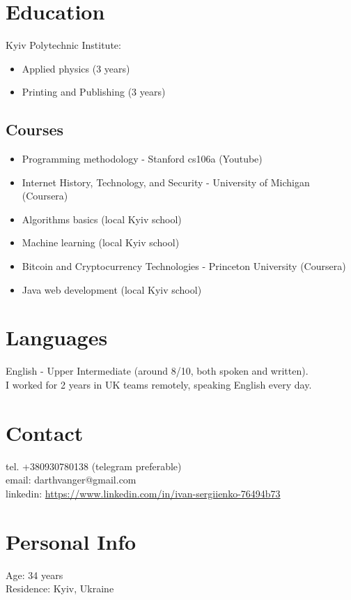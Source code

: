 \documentclass[a4paper, 14pt]{article}
\begin{document}
\section{Education}
  Kyiv Polytechnic Institute: 
  \begin{itemize}
    \item Applied physics (3 years) \\
    \item Printing and Publishing (3 years)
  \end{itemize}

  \subsection{Courses}
  \begin{itemize}
    \item Programming methodology - Stanford cs106a (Youtube) \\
    \item Internet History, Technology, and Security - University of Michigan (Coursera) \\
    \item Algorithms basics (local Kyiv school) \\
    \item Machine learning (local Kyiv school) \\
    \item Bitcoin and Cryptocurrency Technologies - Princeton University (Coursera) \\
    \item Java web development (local Kyiv school)
  \end{itemize}

\section{Languages}
	English - Upper Intermediate (around 8/10, both spoken and written). \\
  I worked for 2 years in UK teams remotely, speaking English every day.

\section{Contact}
	tel. +380930780138 (telegram preferable) \\
	email: darthvanger@gmail.com \\
  linkedin: \url{https://www.linkedin.com/in/ivan-sergiienko-76494b73}

\section{Personal Info}
	Age: 34 years \\
  Residence: Kyiv, Ukraine
\end{document}
